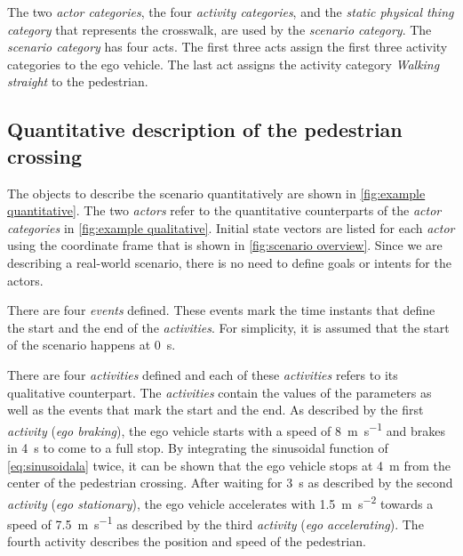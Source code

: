 The two \textit{actor categories}, the four \textit{activity categories}, and the \cstartc\textit{static physical thing category} \cendc\cstartd that represents the crosswalk\cendd, are used by the \textit{scenario category}. The \textit{scenario category} has four acts. The first three acts assign the first three activity categories to the ego vehicle. The last act assigns the activity category \emph{Walking straight} to the pedestrian. 



\subsection{Quantitative description of the pedestrian crossing}
\label{sec:example quantitative}

The objects to describe the scenario quantitatively are shown in \cref{fig:example quantitative}. The two \textit{actors} refer to the quantitative counterparts of the \textit{actor categories} in \cref{fig:example qualitative}. Initial state vectors are listed for each \textit{actor} using the coordinate frame that is shown in \cref{fig:scenario overview}. 
Since we are describing a real-world scenario, there is no need to define \cstarte goals or intents \cende for the actors.


\begin{figure*}[t]
	\centering
	
	\caption{The objects that are used to quantitatively describe the scenario that is schematically shown in \cref{fig:scenario overview}. For the sake of brevity, the tags and the unique ID of each object are omitted.}
	\label{fig:example quantitative}
\end{figure*}

\cstartb There are four \textit{events} defined. These events mark the time instants that define the start and the end of the \textit{activities}. For simplicity, it is assumed that the start of the scenario happens at \SI{0}{\second}. \cendb

There are four \textit{activities} defined and each of these \textit{activities} refers to its qualitative counterpart.
The \textit{activities} contain the values of the parameters as well as \cstartb the events that mark the start and the end\cendb. 
As described by the first \textit{activity} (\emph{ego braking}), the ego vehicle starts with a speed of \SI{8}{\meter\per\second} and brakes in \SI{4}{\second} to come to a full stop. By integrating the sinusoidal function of \cref{eq:sinusoidala} twice, it can be shown that the ego vehicle stops at \SI{4}{\meter} from the center of the pedestrian crossing. 
After waiting for \SI{3}{\second} \cstarte as described by \cende the second \textit{activity} (\emph{ego stationary}), the ego vehicle accelerates with \SI{1.5}{\meter\per\second\squared} towards a speed of \SI{7.5}{\meter\per\second} \cstarte as described by \cende the third \textit{activity} (\emph{ego accelerating}). 
The fourth activity describes the position \cstarte and speed \cende of the pedestrian.

